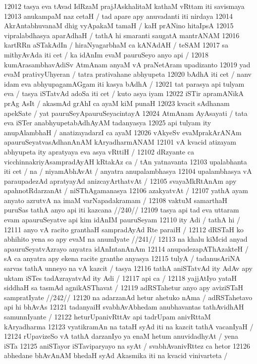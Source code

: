 12012 tasya eva tAvad IdRzaM prajJAskhalitaM kathaM vRttam iti savismaya
12013 anukampaM naz cetaH / tad apare apy anuvadanti iti nirdaya  
12014 AkrAntabhuvanaM dhig vyApakaM tamaH / kaH prANino hitaIpsA
12015 vipralabdhasya aparAdhaH / tathA hi smaranti saugatA mantrANAM 
12016 kartRRn aSTakAdIn / hiraNyagarbhaM ca kANAdAH / teSAM  
12017 sa mithyAvAda iti cet / ka idAnIm evaM pauruSeyo anyo api / 
12018 kumArasambhavAdiSv AtmAnam anyaM vA praNetAram upadizanto  
12019 yad evaM prativyUhyeran / tatra prativahane abhyupeta 
12020 bAdhA iti cet / nanv idam eva abhyupagamAGgam iti kasya bAdhA /  
12021 tat parasya api tulyam eva / tasya iSTatvAd adoSa iti cet / kuto asya iyam
12022 iSTir apramANikA prAg AsIt / akasmAd grAhI ca ayaM kiM punaH
12023 kvacit sAdhanam apekSate / yat pauruSeyApauruSeyacintayA 
12024 AtmAnam AyAsayati / tata eva iSTer anabhyupetabAdhAyAM tadanyasya
12025 api tulyam ity anupAlambhaH / anatizayadarzI ca ayaM 
12026 vAkyeSv evaMprakArANAm apauruSeyatvasAdhanAnAM kAryadharmANAM 
12101 vA kvacid atizayam abhyupeta ity apratyaya eva asya vRttiH / 
12102 dRzyante ca vicchinnakriyAsampradAyAH kRtakAz ca / tAn yatnavanta  
12103 upalabhanta iti cet / na / niyamAbhAvAt / anyatra anupalambhasya
12104 upalambhasya vA paraupadezAd apratyayAd anizcayArthatvAt /
12105 svayaMkRtAnAm apy apahnotRdarzanAt / niSThAgamanasya 
12106 azakyatvAt / 
12107 	yathA ayam anyato azrutvA na imaM varNapadakramam /  
12108 	vaktuM samarthaH puruSas tathA anyo api iti kazcana //240//
12109 tasya api tad eva uttaram evam apauruSeyatve api kim idAnIM pauruSeyam  
12110 ity Adi / tathA hi / 
12111 	anyo vA racito granthaH sampradAyAd Rte paraiH /
12112 	dRSTaH ko abhihito yena so apy evaM na anumIyate //241//
12113 na khalu kiMcid anyad apauruSeyatvAzrayo anyatra idAnIntanAnAm  
12114 anupadezapAThAzakteH / sA ca anyatra apy ekena racite granthe anyasya
12115 tulyA / tadanusAriNA sarvas tathA unneyo na vA kazcit / tasya 
12116 tathA aniSTatvAd ity AdAv apy uktam iSTes tadAzrayatvAd ity Adi / 
12117 api ca /
12118 	yajjAtIyo yataH siddhaH sa tasmAd agnikASThavat / 
12119 	adRSTahetur anyo apy aviziSTaH sampratIyate //242// 
12120 na adarzanAd hetur ahetuko nAma / adRSTahetavo api hi bhAvAs
12121 tadanyaiH svabhAvAbhedam anubhavantas tathAvidhAH samunnIyante /
12122 heturUpanivRttAv api tadrUpam anivRttaM kAryadharma  
12123 vyatikramAn na tataH syAd iti na kazcit tathA vacanIyaH / 
12124 rUpavizeSo vA tathA darzanIyo ya enaM hetum anuvidadhyAt / yena iSTa
12125 aniSTayor iSTaviparyayo na syAt / svabhAvanivRttez ca hetor  
12126 abhedane bhAvAnAM bhedaH syAd Akasmika iti na kvacid vinivarteta /
